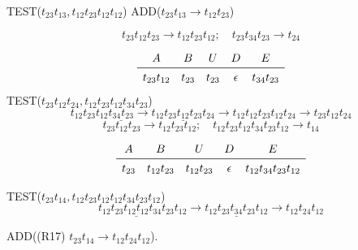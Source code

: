 \documentclass{article}
\begin{document}
TEST($t_{23}t_{13}, t_{12} t_{23} t_{12} t_{12}$)
ADD($t_{23}t_{13} \rightarrow t_{12} t_{23}$)


\[
t_{23} t_{12} t_{23} \rightarrow t_{12} t_{23} t_{12}; \quad t_{23} t_{34} t_{23} \rightarrow t_{24}
\]

\[
\begin{array}{ccccc}
A & B & U & D & E \\
\midrule
t_{23}t_{12} & t_{23} & t_{23} & \epsilon & t_{34} t_{23}
\end{array}
\]
TEST($t_{23}t_{12}t_{24}, t_{12} t_{23} t_{12}t_{34} t_{23}$)
\[ t_{12} t_{23} t_{12}\underline{t_{34} t_{23}} 
 \rightarrow t_{12} \underline{t_{23} t_{12} t_{23}} t_{24} 
 \rightarrow t_{12} t_{12} t_{23} t_{12} t_{24}
 \rightarrow t_{23} t_{12} t_{24}
\]
\[
t_{23} t_{12} t_{23} \rightarrow t_{12} t_{23} t_{12}; 
\quad 
t_{12} t_{23} t_{12} t_{34} t_{23} t_{12} \rightarrow t_{14}
\]

\[
\begin{array}{ccccc}
A & B & U & D & E \\
\midrule
t_{23} & t_{12}t_{23} & t_{12}t_{23} & \epsilon & t_{12} t_{34} t_{23} t_{12}
\end{array}
\]


TEST($t_{23}t_{14}, t_{12} t_{23} t_{12}t_{12} t_{34} t_{23} t_{12}$)
\[
t_{12} t_{23} \underline{t_{12}t_{12}} t_{34} t_{23} t_{12}
\rightarrow t_{12} \underline{t_{23} t_{34} t_{23}} t_{12}
\rightarrow t_{12} t_{24} t_{12}
\]

ADD((R17) $t_{23}t_{14} \rightarrow t_{12} t_{24} t_{12}$).





\end{document}
